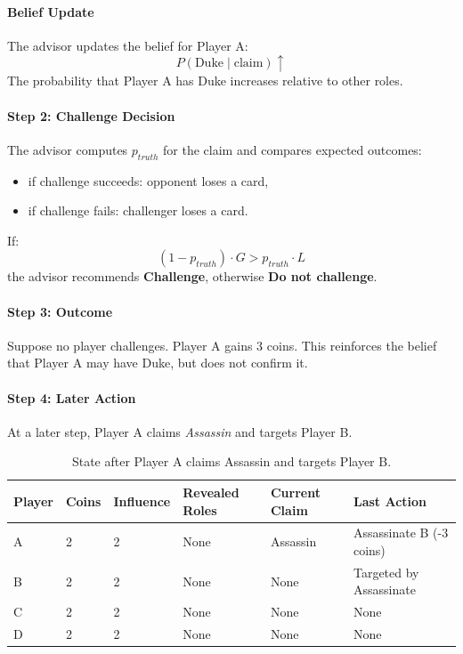 \documentclass[11pt]{article}
\begin{document}
\paragraph{Belief Update}
The advisor updates the belief for Player A:
\[
P(\mathrm{Duke} \mid \mathrm{claim}) \uparrow
\]
The probability that Player A has Duke increases relative to other roles.

\paragraph{Step 2: Challenge Decision}
The advisor computes $p_{truth}$ for the claim and compares expected outcomes:
\begin{itemize}
    \item if challenge succeeds: opponent loses a card,
    \item if challenge fails: challenger loses a card.
\end{itemize}

If:
\[
(1 - p_{truth}) \cdot G > p_{truth} \cdot L
\]
the advisor recommends \textbf{Challenge}, otherwise \textbf{Do not challenge}.

\paragraph{Step 3: Outcome}
Suppose no player challenges. Player A gains 3 coins. This reinforces the belief that Player A may have Duke, but does not confirm it.

\paragraph{Step 4: Later Action}
At a later step, Player A claims \textit{Assassin} and targets Player B.
\begin{table}[H]
\centering
\caption{State after Player A claims Assassin and targets Player B.}
\label{tab:state-assassin}
\begin{tabular}{llllll}
\toprule
Player & Coins & Influence & Revealed Roles & Current Claim & Last Action \\
\midrule
A & 2 & 2 & None & Assassin & Assassinate B (-3 coins) \\
B & 2 & 2 & None & None & Targeted by Assassinate \\
C & 2 & 2 & None & None & None \\
D & 2 & 2 & None & None & None \\
\bottomrule
\end{tabular}
\end{table}
\end{document}
